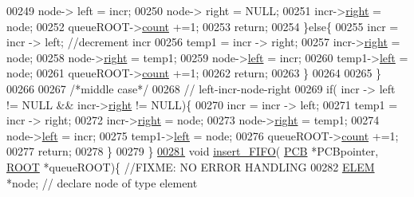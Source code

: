 \begin{DoxyCode}
{00249                         node-> left = incr;
00250                         node-> right = NULL;
00251                         incr->\hyperlink{structpage_a72bca7218659f6f6e4e94cc0bacc26d1}{right} = node;
00252                         queueROOT->\hyperlink{structroot_afa78d0408d4af29e936332a04739d59c}{count} +=1;
00253                         \textcolor{keywordflow}{return};
00254                 \}\textcolor{keywordflow}{else}\{
00255                         incr = incr -> left; \textcolor{comment}{//decrement incr}
00256                         temp1 = incr -> right;
00257                         incr->\hyperlink{structpage_a72bca7218659f6f6e4e94cc0bacc26d1}{right} = node;
00258                         node->\hyperlink{structpage_a72bca7218659f6f6e4e94cc0bacc26d1}{right} = temp1;
00259                         node->\hyperlink{structpage_aea88d51a55db952658327da1995fc8aa}{left} = incr;
00260                         temp1->\hyperlink{structpage_aea88d51a55db952658327da1995fc8aa}{left} = node;
00261                         queueROOT->\hyperlink{structroot_afa78d0408d4af29e936332a04739d59c}{count} +=1;
00262                         \textcolor{keywordflow}{return};
00263                 \}
00264                 
00265         \}
00266         
00267         \textcolor{comment}{/*middle case*/}
00268         \textcolor{comment}{// left-incr-node-right}
00269         \textcolor{keywordflow}{if}( incr -> left != NULL && incr->\hyperlink{structpage_a72bca7218659f6f6e4e94cc0bacc26d1}{right} != NULL)\{
00270                 incr = incr -> left;
00271                 temp1 = incr -> right;
00272                 incr->\hyperlink{structpage_a72bca7218659f6f6e4e94cc0bacc26d1}{right} = node;
00273                 node->\hyperlink{structpage_a72bca7218659f6f6e4e94cc0bacc26d1}{right} = temp1;
00274                 node->\hyperlink{structpage_aea88d51a55db952658327da1995fc8aa}{left} = incr;
00275                 temp1->\hyperlink{structpage_aea88d51a55db952658327da1995fc8aa}{left} = node;
00276                 queueROOT->\hyperlink{structroot_afa78d0408d4af29e936332a04739d59c}{count} +=1;
00277                 \textcolor{keywordflow}{return};
00278         \}
00279 \}
\hypertarget{mpx__r2_8c_source_l00281}{}\hyperlink{mpx__r2_8h_a89d5f57a5b157787f44875a8f27a6233}{00281} \textcolor{keywordtype}{void} \hyperlink{mpx__r2_8c_a58a3e3525ed6385f632835b55ab7d7d1}{insert_FIFO}( \hyperlink{structprocess}{PCB} *PCBpointer, \hyperlink{structroot}{ROOT} *queueROOT)\{ \textcolor{comment}{//FIXME: NO ERROR HANDLING}
00282         \hyperlink{structpage}{ELEM} *node; \textcolor{comment}{// declare node of type element}
}
\end{DoxyCode}
